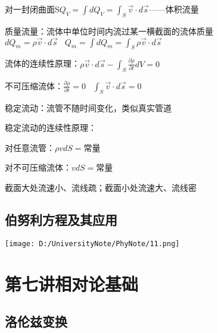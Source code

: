 \documentclass[UTF8]{article}
\begin{document}
    对一封闭曲面S$Q_V = \int dQ_V = \int_S\vec{v}\cdot d\vec{s}$——体积流量

    质量流量：流体中单位时间内流过某一横截面的流体质量$dQ_m = \rho \vec{v}\cdot d\vec{s}\;\;\;Q_m = \int dQ_m = \int_S\rho\vec{v}\cdot d\vec{s}$

    流体的连续性原理：$\rho \vec{v}\cdot d\vec{s} - \int_S\frac{\partial \rho}{\partial t}dV = 0$

    不可压缩流体：$\frac{\partial \rho}{\partial t} = 0\;\;\;\int_S\vec{v}\cdot d\vec{s} = 0$

    稳定流动：流管不随时间变化，类似真实管道

    稳定流动的连续性原理：

    \;\;对任意流管：$\rho vdS = $常量
    
    \;\;对不可压缩流体：$vdS = $常量

    截面大处流速小、流线疏；截面小处流速大、流线密

\subsection{伯努利方程及其应用}

\texttt{[image: D:/UniversityNote/PhyNote/11.png]}

\newpage
\section{第七讲\;\;相对论基础}
\subsection{洛伦兹变换}
\end{document}
